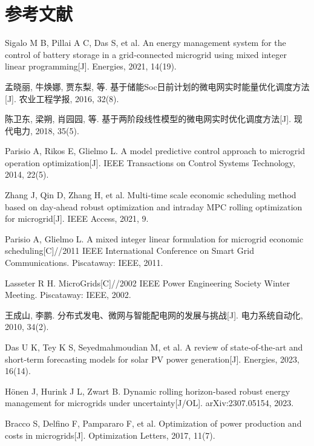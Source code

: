 \section*{参考文献}

\begin{enumerate}[label={[\arabic*]}, leftmargin=2.5em]
    \item Sigalo M B, Pillai A C, Das S, et al. An energy management system for the control of battery storage in a grid‑connected microgrid using mixed integer linear programming[J]. Energies, 2021, 14(19).
    \item 孟晓丽, 牛焕娜, 贾东梨, 等. 基于储能Soc日前计划的微电网实时能量优化调度方法[J]. 农业工程学报, 2016, 32(8).
    \item 陈卫东, 梁朔, 肖园园, 等. 基于两阶段线性模型的微电网实时优化调度方法[J]. 现代电力, 2018, 35(5).
    \item Parisio A, Rikos E, Glielmo L. A model predictive control approach to microgrid operation optimization[J]. IEEE Transactions on Control Systems Technology, 2014, 22(5).
    \item Zhang J, Qin D, Zhang H, et al. Multi‑time scale economic scheduling method based on day‑ahead robust optimization and intraday MPC rolling optimization for microgrid[J]. IEEE Access, 2021, 9.
    \item Parisio A, Glielmo L. A mixed integer linear formulation for microgrid economic scheduling[C]//2011 IEEE International Conference on Smart Grid Communications. Piscataway: IEEE, 2011.
    \item Lasseter R H. MicroGrids[C]//2002 IEEE Power Engineering Society Winter Meeting. Piscataway: IEEE, 2002.
    \item 王成山, 李鹏. 分布式发电、微网与智能配电网的发展与挑战[J]. 电力系统自动化, 2010, 34(2).
    \item Das U K, Tey K S, Seyedmahmoudian M, et al. A review of state‑of‑the‑art and short‑term forecasting models for solar PV power generation[J]. Energies, 2023, 16(14).
    \item Hönen J, Hurink J L, Zwart B. Dynamic rolling horizon‑based robust energy management for microgrids under uncertainty[J/OL]. arXiv:2307.05154, 2023.
    \item Bracco S, Delfino F, Pampararo F, et al. Optimization of power production and costs in microgrids[J]. Optimization Letters, 2017, 11(7).
\end{enumerate}
